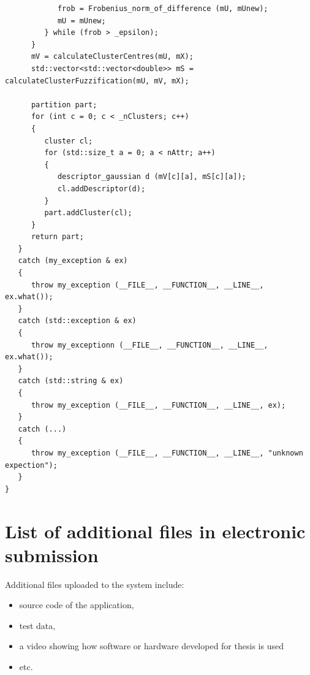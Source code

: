 \documentclass[a4paper,twoside,12pt]{book}
\begin{document}
\begin{appendices}
\begin{lstlisting}
            frob = Frobenius_norm_of_difference (mU, mUnew);
            mU = mUnew;
         } while (frob > _epsilon);
      }
      mV = calculateClusterCentres(mU, mX);
      std::vector<std::vector<double>> mS = calculateClusterFuzzification(mU, mV, mX);
      
      partition part;
      for (int c = 0; c < _nClusters; c++)
      {
         cluster cl; 
         for (std::size_t a = 0; a < nAttr; a++)
         {
            descriptor_gaussian d (mV[c][a], mS[c][a]);
            cl.addDescriptor(d);
         }
         part.addCluster(cl);
      }
      return part;
   }
   catch (my_exception & ex)                                  
   {                                                       
      throw my_exception (__FILE__, __FUNCTION__, __LINE__, ex.what()); 
   }                                                          
   catch (std::exception & ex)                                 
   {                                                            
      throw my_exceptionn (__FILE__, __FUNCTION__, __LINE__, ex.what()); 
   }                                                            
   catch (std::string & ex)                                     
   {                                                            
      throw my_exception (__FILE__, __FUNCTION__, __LINE__, ex);        
   }                                                             
   catch (...)                                                   
   {                                                             
      throw my_exception (__FILE__, __FUNCTION__, __LINE__, "unknown expection");       
   }  
}
\end{lstlisting} 

\chapter*{List of additional files in electronic submission }

Additional files uploaded to the system include:
\begin{itemize}
																
\item source code of the application,
\item test data,
\item a video showing how software or hardware developed for thesis is used
\item etc.
\end{itemize}
 
\listoffigures
{}
\listoftables
{}
	

\end{appendices}
\end{document}
